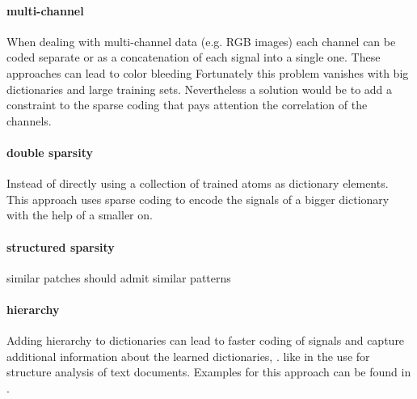 
\paragraph{multi-channel}
When dealing with multi-channel data (e.g. RGB images) 
each channel can be coded separate or as a concatenation of each signal into a single one.
These approaches can lead to color bleeding \cite{mairal08sparse} 
Fortunately this problem vanishes with big dictionaries and large training sets. \cite{mairal08sparse}
Nevertheless a solution would be to add a constraint to the sparse coding that pays attention the correlation of the channels.

\paragraph{double sparsity}
Instead of directly using a collection of trained atoms as dictionary elements. This approach uses sparse coding
to encode the signals of a bigger dictionary with the help of a smaller on. \cite{Rubinstein2009} 

\paragraph{structured sparsity}
similar patches should admit similar patterns \cite{Mairal2009}
\cite{group sparsity}

\paragraph{hierarchy}
Adding hierarchy to dictionaries can lead to faster coding of signals and capture additional information about the learned dictionaries, .
like in the use for structure analysis of text documents.  Examples for this approach can be found in \cite{Jenatton2010}.






